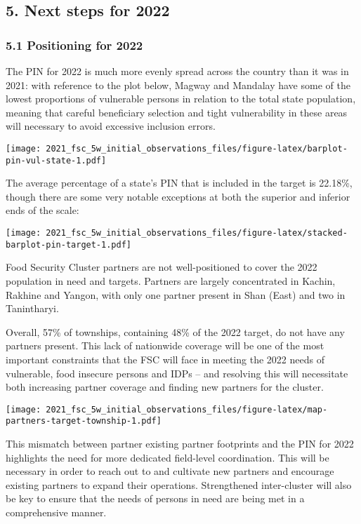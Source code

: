 \documentclass[
]{article}
\begin{document}
\hypertarget{next-steps-for-2022}{%
\subsection{5. Next steps for 2022}\label{next-steps-for-2022}}

\hypertarget{positioning-for-2022}{%
\subsubsection{5.1 Positioning for 2022}\label{positioning-for-2022}}

The PIN for 2022 is much more evenly spread across the country than it
was in 2021: with reference to the plot below, Magway and Mandalay have
some of the lowest proportions of vulnerable persons in relation to the
total state population, meaning that careful beneficiary selection and
tight vulnerability in these areas will necessary to avoid excessive
inclusion errors.

\texttt{[image: 2021\_fsc\_5w\_initial\_observations\_files/figure-latex/barplot-pin-vul-state-1.pdf]}

The average percentage of a state's PIN that is included in the target
is 22.18\%, though there are some very notable exceptions at both the
superior and inferior ends of the scale:

\texttt{[image: 2021\_fsc\_5w\_initial\_observations\_files/figure-latex/stacked-barplot-pin-target-1.pdf]}

Food Security Cluster partners are not well-positioned to cover the 2022
population in need and targets. Partners are largely concentrated in
Kachin, Rakhine and Yangon, with only one partner present in Shan (East)
and two in Tanintharyi.

Overall, 57\% of townships, containing 48\% of the 2022 target, do not
have any partners present. This lack of nationwide coverage will be one
of the most important constraints that the FSC will face in meeting the
2022 needs of vulnerable, food insecure persons and IDPs -- and
resolving this will necessitate both increasing partner coverage and
finding new partners for the cluster.

\texttt{[image: 2021\_fsc\_5w\_initial\_observations\_files/figure-latex/map-partners-target-township-1.pdf]}

This mismatch between partner existing partner footprints and the PIN
for 2022 highlights the need for more dedicated field-level
coordination. This will be necessary in order to reach out to and
cultivate new partners and encourage existing partners to expand their
operations. Strengthened inter-cluster will also be key to ensure that
the needs of persons in need are being met in a comprehensive manner.
\end{document}
